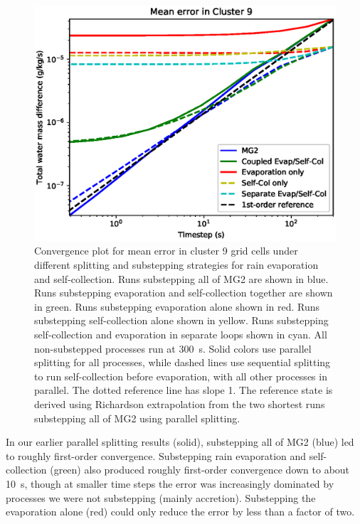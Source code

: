 \documentclass [11pt, proquest] {uwthesis}[2020/02/24]
\begin{document}
\begin{figure}[htbp]
  \includegraphics[width=6.5in]{substep_convergence_mean_seq_c9_richext.eps}
  \caption[Convergence plot for mean MG2 error in a cluster of rainy, cloudless grid cells using different splitting and substepping strategies]{Convergence plot for mean error in cluster 9 grid cells under different splitting and substepping strategies for rain evaporation and self-collection. Runs substepping all of MG2 are shown in blue. Runs substepping evaporation and self-collection together are shown in green. Runs substepping evaporation alone shown in red. Runs substepping self-collection alone shown in yellow. Runs substepping self-collection and evaporation in separate loops shown in cyan. All non-substepped processes run at \SI{300}{\second}. Solid colors use parallel splitting for all processes, while dashed lines use sequential splitting to run self-collection before evaporation, with all other processes in parallel. The dotted reference line has slope \num{1}. The reference state is derived using Richardson extrapolation from the two shortest runs substepping all of MG2 using parallel splitting.}
  \label{fig:convergence-splitting}
\end{figure}

In our earlier parallel splitting results (solid), substepping all of MG2 (blue) led to roughly first-order convergence. Substepping rain evaporation and self-collection (green) also produced roughly first-order convergence down to about \SI{10}{\second}, though at smaller time steps the error was increasingly dominated by processes we were not substepping (mainly accretion). Substepping the evaporation alone (red) could only reduce the error by less than a factor of two.
\end{document}
